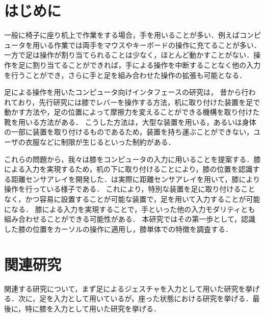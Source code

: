 \documentclass[submit, techrep]{ipsj}
\begin{document}
\section{はじめに}
一般に椅子に座り机上で作業をする場合，手を用いることが多い．例えばコンピュータを用いる作業では両手をマウスやキーボードの操作に充てることが多い．一方で足は操作が割り当てられることは少なく，ほとんど動かすことがない．操作を足に割り当てることができれば，手による操作を中断することなく他の入力を行うことができ，さらに手と足を組み合わせた操作の拡張も可能となる．\par
足による操作を用いたコンピュータ向けインタフェースの研究は，
昔から行われており，先行研究には膝でレバーを操作する方法\cite{1698228}，机に取り付けた装置を足で動かす方法\cite{Pearson:1986:MMD:22627.22392, Pearson:1988:EEP:57167.57169}や，足の位置によって摩擦力を変えることができる機構を取り付けた靴\cite{Horodniczy:2017:FHE:3025453.3025625}を用いる方法がある．
こうした方法は，大型な装置を用いる，あるいは身体の一部に装置を取り付けるものであるため，装置を持ち運ぶことができない，ユーザの衣服などに制限が生じるといった制約がある．\par
これらの問題から，我々は膝をコンピュータの入力に用いることを提案する．膝による入力を実現するため，机の下に取り付けることにより，膝の位置を認識する距離センサアレイを開発した．は実際に距離センサアレイを用いて，膝により操作を行っている様子である．
これにより，特別な装置を足に取り付けることなく，かつ容易に設置することが可能な装置で，足を用いて入力することが可能になる．
膝による入力を実現することで，手といった他の入力モダリティとも組み合わせることができる可能性がある．
本研究ではその第一歩として，認識した膝の位置をカーソルの操作に適用し，膝単体での特徴を調査する．



\section{関連研究}
関連する研究について，まず足によるジェスチャを入力として用いた研究を挙げる．次に，足を入力として用いているが，座った状態における研究を挙げる．最後に，特に膝を入力として用いた研究を挙げる．
\end{document}
